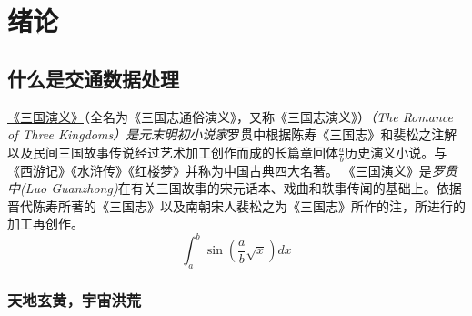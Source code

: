 \chapter{绪论}

\section{什么是交通数据处理}

\underline{《三国演义》}（全名为《三国志通俗演义》，又称《三国志演义》）\emph{（The Romance of Three Kingdoms）是元末明初小说家}罗贯中根据陈寿《三国志》和裴松之注解以及民间三国故事传说经过艺术加工创作而成的长篇章回体$\frac{a}{b}$历史演义小说。与《西游记》《水浒传》《红楼梦》并称为中国古典四大名著。
《三国演义》是\textit{罗贯中(Luo Guanzhong)}在有关{\sffamily 三国故事的宋元话本}、戏曲和轶事传闻的基础上。依据晋代陈寿所著的《三国志》以及南朝宋人裴松之为《三国志》所作的注，所进行的加工再创作。
\begin{equation}
    \int_a^b\sin(\frac{a}{b}\sqrt{x})dx
\end{equation}

\subsection{天地玄黄，宇宙洪荒}

